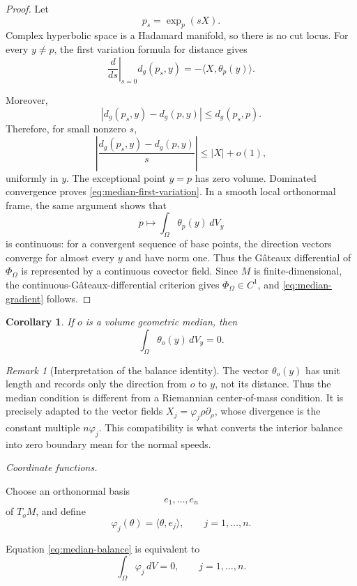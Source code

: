 \documentclass[11pt,reqno]{amsart}
\numberwithin{equation}{section}
\newtheorem{corollary}[theorem]{Corollary}
\theoremstyle{definition}
\theoremstyle{remark}
\newtheorem{remark}[theorem]{Remark}
\newcommand{\distg}{d_g}
\newcommand{\ithead}[1]{%
  \par\medskip\noindent\textit{#1}\enspace
}
\begin{document}
\begin{proof}
Let
\[
p_s=\exp_p(sX).
\]
Complex hyperbolic space is a Hadamard manifold, so there is no cut locus.
For every \(y\ne p\), the first variation formula for distance gives
\[
\left.
\frac{d}{ds}
\right|_{s=0}
\distg(p_s,y)
=
-
\langle X,\theta_p(y)\rangle.
\]

Moreover,
\[
|\distg(p_s,y)-\distg(p,y)|
\le
\distg(p_s,p).
\]
Therefore, for small nonzero \(s\),
\[
\left|
\frac{\distg(p_s,y)-\distg(p,y)}{s}
\right|
\le
|X|+o(1),
\]
uniformly in \(y\). The exceptional point \(y=p\) has zero volume.
Dominated convergence proves \eqref{eq:median-first-variation}.  In a smooth
local orthonormal frame, the same argument shows that
\[
p\longmapsto \int_\Omega\theta_p(y)\,dV_y
\]
is continuous: for a convergent sequence of base points, the direction vectors
converge for almost every \(y\) and have norm one.  Thus the G\^ateaux
differential of \(\Phi_\Omega\) is represented by a continuous covector field.
Since \(M\) is finite-dimensional, the continuous-G\^ateaux-differential
criterion gives \(\Phi_\Omega\in C^1\), and
\eqref{eq:median-gradient} follows.
\end{proof}

\begin{corollary}
\label{cor:median-balance}
If \(o\) is a volume geometric median, then
\begin{equation}
\int_\Omega\theta_o(y)\,dV_y=0.
\label{eq:median-balance}
\end{equation}
\end{corollary}

\begin{remark}[Interpretation of the balance identity]
The vector $\theta_o(y)$ has unit length and records only the direction from
$o$ to $y$, not its distance.  Thus the median condition is different from a
Riemannian center-of-mass condition.  It is precisely adapted to the vector
fields $X_j=\varphi_j\rho\partial_\rho$, whose divergence is the constant
multiple $n\varphi_j$.  This compatibility is what converts the interior
balance into zero boundary mean for the normal speeds.
\end{remark}

\ithead{Coordinate functions.}

Choose an orthonormal basis
\[
e_1,\dots,e_n
\]
of \(T_oM\), and define
\[
\varphi_j(\theta)
=
\langle\theta,e_j\rangle,
\qquad
j=1,\dots,n.
\]

Equation \eqref{eq:median-balance} is equivalent to
\[
\int_\Omega\varphi_j\,dV=0,
\qquad
j=1,\dots,n.
\]
\end{document}
